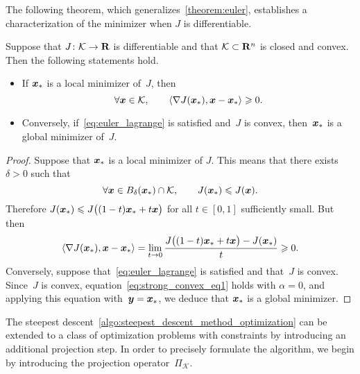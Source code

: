 The following theorem,
which generalizes~\eqref{theorem:euler},
establishes a characterization of the minimizer when $J$ is differentiable.
\begin{theorem}
    \label{theorem:euler_lagrange}
    Suppose that $J\colon \mathcal K \to \mathbf R$ is differentiable and
    that $\mathcal K \subset \mathbf R^n$ is closed and convex.
    Then the following statements hold.
    \begin{itemize}
        \item
            If $\mathbf{\boldsymbol{x}}_*$ is a local minimizer of~$J$,
            then
            \begin{equation}
                \label{eq:euler_lagrange}
                \forall \mathbf{\boldsymbol{x}} \in \mathcal K,
                \qquad \langle\nabla J(\mathbf{\boldsymbol{x}}_*), \mathbf{\boldsymbol{x}} - \mathbf{\boldsymbol{x}}_*\rangle \geqslant 0.
            \end{equation}

        \item
            Conversely, if~\eqref{eq:euler_lagrange} is satisfied and~$J$ is convex,
            then~$\mathbf{\boldsymbol{x}}_*$ is a global minimizer of~$J$.
    \end{itemize}
\end{theorem}
\begin{proof}
    Suppose that $\mathbf{\boldsymbol{x}}_*$ is a local minimizer of $J$.
    This means that there exists~$\delta > 0$ such that
    \[
        \forall \mathbf{\boldsymbol{x}} \in B_{\delta}(\mathbf{\boldsymbol{x}}_*) \cap \mathcal K, \qquad
        J(\mathbf{\boldsymbol{x}}_*) \leqslant J(\mathbf{\boldsymbol{x}}).
    \]
    Therefore $J(\mathbf{\boldsymbol{x}}_*) \leqslant J\bigl((1-t)\mathbf{\boldsymbol{x}}_* + t \mathbf{\boldsymbol{x}}\bigr)$ for all $t \in [0, 1]$ sufficiently small.
    But then
    \[
        \langle\nabla J(\mathbf{\boldsymbol{x}}_*), \mathbf{\boldsymbol{x}} - \mathbf{\boldsymbol{x}}_*\rangle
        = \lim_{t \to 0} \frac{ J\bigl((1-t)\mathbf{\boldsymbol{x}}_* + t \mathbf{\boldsymbol{x}}\bigr)  - J(\mathbf{\boldsymbol{x}}_*)}{t} \geqslant 0.
    \]
    Conversely, suppose that~\eqref{eq:euler_lagrange} is satisfied and that~$J$ is convex.
    Since~$J$ is convex, equation~\eqref{eq:strong_convex_eq1} holds with $\alpha = 0$,
    and applying this equation with~$\mathbf{\boldsymbol{y}} = \mathbf{\boldsymbol{x}}_*$,
    we deduce that $\mathbf{\boldsymbol{x}}_*$ is a global minimizer.
\end{proof}

The steepest descent~\cref{algo:steepest_descent_method_optimization} can be extended to a class of optimization problems with constraints by introducing an additional projection step.
In order to precisely formulate the algorithm,
we begin by introducing the projection operator~$\Pi_{\mathcal K}$.

